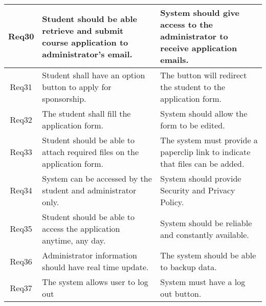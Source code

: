 \begin{table}[ht]
\begin{tabular}{|c|p{7cm}|p{7cm}|}
		\hline
		Req30 & Student should be able retrieve and submit course application to administrator’s email. & System should give access to the administrator to receive application emails.\\
		\hline
		Req31& Student shall have an option button to apply for sponsorship. & The button will redirect the student to the application form.\\
		\hline
		Req32 & The student shall fill the application form.
		& System should allow the form to be edited.\\
		\hline
		Req33 & Student should be able to attach required files on the application form. & The system must provide a paperclip link to indicate that files can be added.\\
		\hline
		Req34 & System can be accessed by the student and administrator only. & System should provide Security and Privacy Policy.\\
		\hline
		Req35 & Student should be able to access the application anytime, any day. & System should be reliable and constantly available. \\
		\hline
		Req36 & Administrator information should have real time update. & The system should be able to backup data.\\
		\hline
		Req37 & The system allows user to log out& System must have a log out button.\\
		\hline
		
	\end{tabular} 
\end{table}


